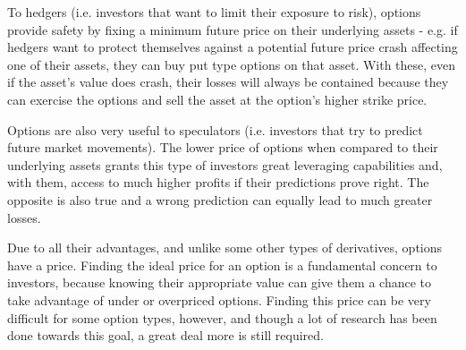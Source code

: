 To hedgers (i.e. investors that want to limit their exposure to risk), options provide safety by fixing a minimum future price on their underlying assets - e.g. if hedgers want to protect themselves against a potential future price crash affecting one of their assets, they can buy put type options on that asset. With these, even if the asset's value does crash, their losses will always be contained because they can exercise the options and sell the asset at the option's higher strike price.

Options are also very useful to speculators (i.e. investors that try to predict future market movements). The lower price of options when compared to their underlying assets grants this type of investors great leveraging capabilities and, with them, access to much higher profits if their predictions prove right. The opposite is also true and a wrong prediction can equally lead to much greater losses.

Due to all their advantages, and unlike some other types of derivatives, options have a price. Finding the ideal price for an option is a fundamental concern to investors, because knowing their appropriate value can give them a chance to take advantage of under or overpriced options.
Finding this price can be very difficult for some option types, however, and though a lot of research has been done towards this goal, a great deal more is still required.

